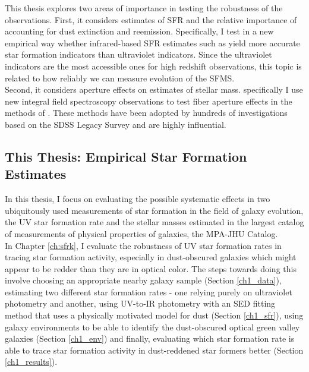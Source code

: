 This thesis explores two areas of importance in testing the robustness
of the observations. First, it considers estimates of SFR and the
relative importance of accounting for dust extinction and reemission.
Specifically, I test in a new empirical way whether infrared-based SFR
estimates such as \citet{da_cunha_simple_2008} yield more accurate star 
formation indicators than ultraviolet indicators. Since the ultraviolet
indicators are the most accessible ones for high redshift
observations, this topic is related to how reliably we can measure
evolution of the SFMS.\\

Second, it considers aperture effects on estimates of stellar mass.
specifically I use new integral field spectroscopy observations to
test fiber aperture effects in the methods of
\citet{kauffmann_stellar_2003}. These methods have been adopted by
hundreds of investigations based on the SDSS Legacy Survey and are
highly influential.

\subsection{This Thesis: Empirical Star Formation Estimates}

In this thesis, I focus on evaluating the possible systematic effects in two ubiquitously used measurements of star formation in the field of galaxy evolution, the UV star formation rate and the stellar masses estimated in the largest catalog of measurements of physical properties of galaxies, the MPA-JHU Catalog.\\

In Chapter \ref{ch:sfrk}, I evaluate the robustness of UV star formation rates in tracing star formation activity, especially in dust-obscured galaxies which might appear to be redder than they are in optical color. The steps towards doing this involve choosing an appropriate nearby galaxy sample (Section \ref{ch1_data}), estimating two different star formation rates - one relying purely on ultraviolet photometry and another, using UV-to-IR photometry with an SED fitting method that uses a physically motivated model for dust (Section \ref{ch1_sfr}), using galaxy environments to be able to identify the dust-obscured optical green valley galaxies (Section \ref{ch1_env}) and finally, evaluating which star formation rate is able to trace star formation activity in dust-reddened star formers better (Section \ref{ch1_results}).\\


